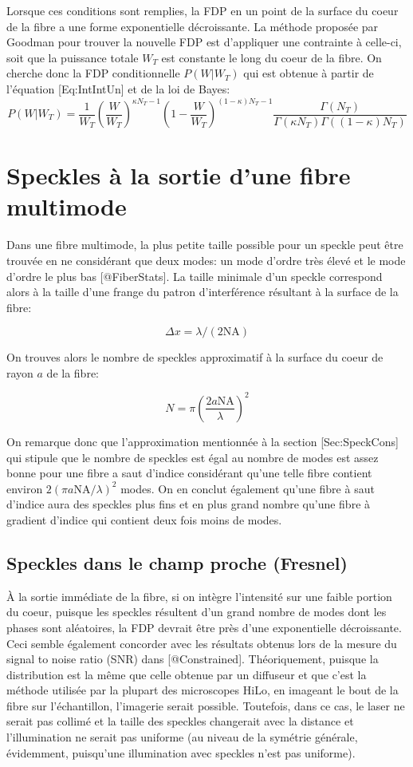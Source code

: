 \documentclass[]{article}
\begin{document}
Lorsque ces conditions sont remplies, la FDP en un point de la surface
du coeur de la fibre a une forme exponentielle décroissante. La méthode
proposée par Goodman pour trouver la nouvelle FDP est d'appliquer une
contrainte à celle-ci, soit que la puissance totale \(W_T\) est
constante le long du coeur de la fibre. On cherche donc la FDP
conditionnelle \(P(W|W_T)\) qui est obtenue à partir de l'équation
{[}Eq:IntIntUn{]} et de la loi de Bayes: \[
P(W|W_T) = \frac{1}{W_T}\left(\frac{W}{W_T}\right)^{\kappa N_{T}-1}\left(1-\frac{W}{W_T}\right)^{(1-\kappa)N_{T}-1}\frac{\Gamma(N_{T})}{\Gamma(\kappa N_{T})\Gamma((1-\kappa)N_{T})}
\]

\section{Speckles à la sortie d'une fibre
multimode}\label{speckles-uxe0-la-sortie-dune-fibre-multimode}

Dans une fibre multimode, la plus petite taille possible pour un speckle
peut être trouvée en ne considérant que deux modes: un mode d'ordre très
élevé et le mode d'ordre le plus bas {[}@FiberStats{]}. La taille
minimale d'un speckle correspond alors à la taille d'une frange du
patron d'interférence résultant à la surface de la fibre:

\[
\Delta x = \lambda/(2\text{NA})
\]

On trouves alors le nombre de speckles approximatif à la surface du
coeur de rayon \(a\) de la fibre:

\[
N = \pi\left(\frac{2a\text{NA}}{\lambda}\right)^2
\]

On remarque donc que l'approximation mentionnée à la section
{[}Sec:SpeckCons{]} qui stipule que le nombre de speckles est égal au
nombre de modes est assez bonne pour une fibre a saut d'indice
considérant qu'une telle fibre contient environ
\(2(\pi a\text{NA}/\lambda)^2\) modes. On en conclut également qu'une
fibre à saut d'indice aura des speckles plus fins et en plus grand
nombre qu'une fibre à gradient d'indice qui contient deux fois moins de
modes.

\subsection{Speckles dans le champ proche
(Fresnel)}\label{speckles-dans-le-champ-proche-fresnel}

À la sortie immédiate de la fibre, si on intègre l'intensité sur une
faible portion du coeur, puisque les speckles résultent d'un grand
nombre de modes dont les phases sont aléatoires, la FDP devrait être
près d'une exponentielle décroissante. Ceci semble également concorder
avec les résultats obtenus lors de la mesure du signal to noise ratio
(SNR) dans {[}@Constrained{]}. Théoriquement, puisque la distribution
est la même que celle obtenue par un diffuseur et que c'est la méthode
utilisée par la plupart des microscopes HiLo, en imageant le bout de la
fibre sur l'échantillon, l'imagerie serait possible. Toutefois, dans ce
cas, le laser ne serait pas collimé et la taille des speckles changerait
avec la distance et l'illumination ne serait pas uniforme (au niveau de
la symétrie générale, évidemment, puisqu'une illumination avec speckles
n'est pas uniforme).
\end{document}
